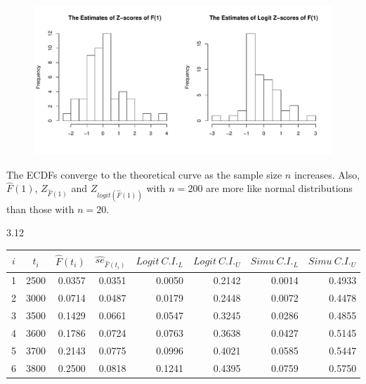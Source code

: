 \documentclass[paper=a4, fontsize=11pt]{scrartcl} %
\numberwithin{equation}{section} %
\numberwithin{figure}{section} %
\numberwithin{table}{section} %
\begin{document}
\begin{itemize}
{\begin{figure}[h]
		\end{figure}		
		\begin{figure}[h]
			\includegraphics[width = 6 in]{3_11_2.pdf}
		\end{figure}			
	}
\end{itemize}

\qquad The ECDFs converge to the theoretical curve as the sample size $n$ increases. Also, $\widehat{F}(1)$, $Z_{\widehat{F}(1)}$ and $Z_{logit\left(\widehat{F}(1)\right)}$ with $n=200$ are more like normal distributions than those with $n = 20$.


\newpage
3.12

		\begin{table}[h]
			\begin{center}
			\begin{tabular}{ccrrrrrr}
				$i$  	& 	$t_i$ 	&  	$\widehat{F}(t_i)$ & 
				$\widehat{se}_{\widehat{F}(t_i)}$  & $Logit\ C.I._L$ & $Logit\ C.I._U$  & $Simu\ C.I._L$ & $Simu\ C.I._U$\\ \hline
					1 & 2500 & 0.0357 & 0.0351  & 0.0050  & 0.2142  & 0.0014  & 0.4933 \\
					2 & 3000 & 0.0714 & 0.0487  & 0.0179  & 0.2448  & 0.0072  & 0.4478 \\
					3 & 3500 & 0.1429 & 0.0661  & 0.0547  & 0.3245  & 0.0286  & 0.4855 \\
					4 & 3600 & 0.1786 & 0.0724  & 0.0763  & 0.3638  & 0.0427  & 0.5145 \\
					5 & 3700 & 0.2143 & 0.0775  & 0.0996  & 0.4021  & 0.0585  & 0.5447 \\
					6 & 3800 & 0.2500 & 0.0818  & 0.1241  & 0.4395  & 0.0759  & 0.5750 \\
			\end{tabular}
			\end{center}
		\end{table}
\end{document}
